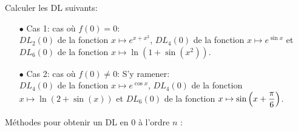 \documentclass[a4paper, 11pt]{article}
\begin{document}
{{}

{\footnotesize \begin{exercice} Calculer les DL suivants:
\begin{itemize}
\item[$\bullet$] Cas 1: cas o\`{u} $f(0)=0$:\\
\noindent $DL_2(0)$ de la fonction $x\mapsto e^{x+x^2}$, $DL_4(0)$ de la fonction $x\mapsto e^{\sin{x}}$ et $DL_6(0)$ de la fonction $x\mapsto \ln{(1+\sin{(x^2)})}$.
\item[$\bullet$] Cas 2: cas o\`{u} $f(0)\not=0$: S'y ramener:\\
\noindent $DL_4(0)$ de la fonction $x\mapsto e^{\cos{x}}$, $DL_4(0)$ de la fonction $x\mapsto \ln{(2+\sin{(x)})}$ et $DL_6(0)$ de la fonction $x\mapsto \sin{\left(  x+\displaystyle\frac{\pi}{6}\right)}$.
\end{itemize}
\end{exercice}
}

%
%
% 


\vsec\vsec


\begin{dboxminipage}{0.9 \textwidth}

\noindent M\'ethodes pour obtenir un DL en 0 \`a l'ordre $n$ :


\end{dboxminipage}}
\end{document}

